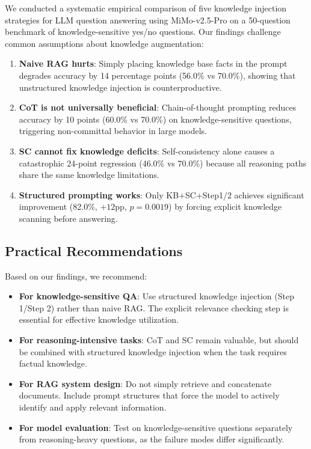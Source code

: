 We conducted a systematic empirical comparison of five knowledge injection strategies for LLM question answering using MiMo-v2.5-Pro on a 50-question benchmark of knowledge-sensitive yes/no questions. Our findings challenge common assumptions about knowledge augmentation:

\begin{enumerate}
\item \textbf{Naive RAG hurts}: Simply placing knowledge base facts in the prompt degrades accuracy by 14 percentage points (56.0\% vs 70.0\%), showing that unstructured knowledge injection is counterproductive.

\item \textbf{CoT is not universally beneficial}: Chain-of-thought prompting reduces accuracy by 10 points (60.0\% vs 70.0\%) on knowledge-sensitive questions, triggering non-committal behavior in large models.

\item \textbf{SC cannot fix knowledge deficits}: Self-consistency alone causes a catastrophic 24-point regression (46.0\% vs 70.0\%) because all reasoning paths share the same knowledge limitations.

\item \textbf{Structured prompting works}: Only KB+SC+Step1/2 achieves significant improvement (82.0\%, $+12$pp, $p=0.0019$) by forcing explicit knowledge scanning before answering.
\end{enumerate}

\subsection{Practical Recommendations}

Based on our findings, we recommend:

\begin{itemize}
\item \textbf{For knowledge-sensitive QA}: Use structured knowledge injection (Step 1/Step 2) rather than naive RAG. The explicit relevance checking step is essential for effective knowledge utilization.

\item \textbf{For reasoning-intensive tasks}: CoT and SC remain valuable, but should be combined with structured knowledge injection when the task requires factual knowledge.

\item \textbf{For RAG system design}: Do not simply retrieve and concatenate documents. Include prompt structures that force the model to actively identify and apply relevant information.

\item \textbf{For model evaluation}: Test on knowledge-sensitive questions separately from reasoning-heavy questions, as the failure modes differ significantly.
\end{itemize}

